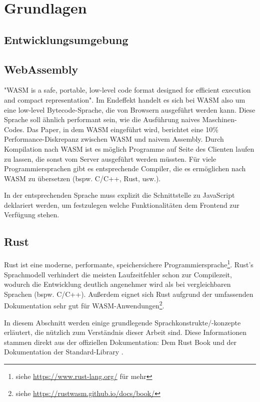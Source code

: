 \chapter{Grundlagen}\label{chap:prereqs}

\section{Entwicklungsumgebung}

\section{WebAssembly}

"\ac{WASM} is a safe, portable, low-level code format designed for efficient execution and compact representation"\cite{WebAssemblyCoreSpecification}. Im Endeffekt handelt es sich bei \ac{WASM} also um eine low-level Bytecode-Sprache, die von Browsern ausgeführt werden kann. Diese Sprache soll ähnlich performant sein, wie die Ausführung naives Maschinen-Codes. Das Paper, in dem \ac{WASM} eingeführt wird, berichtet eine 10\% Performance-Diskrepanz zwischen \ac{WASM} und naivem Assembly\cite{10.1145/3062341.3062363}. Durch Kompilation nach \ac{WASM} ist es möglich Programme auf Seite des Clienten laufen zu lassen, die sonst vom Server ausgeführt werden müssten.
Für viele Programmiersprachen gibt es entsprechende Compiler, die es ermöglichen nach \ac{WASM} zu übersetzen (bspw. C/C++, Rust, usw.).

In der entsprechenden Sprache muss explizit die Schnittstelle zu JavaScript deklariert werden, um festzulegen welche Funktionalitäten dem Frontend zur Verfügung stehen.

\section{Rust}

Rust ist eine moderne, performante, speichersichere Programmiersprache\footnote{siehe \url{https://www.rust-lang.org/} für mehr}. Rust's Sprachmodell verhindert die meisten Laufzeitfehler schon zur Compilezeit, wodurch die Entwicklung deutlich angenehmer wird als bei vergleichbaren Sprachen (bspw. C/C++). Außerdem eignet sich Rust aufgrund der umfassenden Dokumentation sehr gut für \ac{WASM}-Anwendungen\footnote{siehe \url{https://rustwasm.github.io/docs/book/}}.

In diesem Abschnitt werden einige grundlegende Sprachkonstrukte/-konzepte erläutert, die nützlich zum Verständnis dieser Arbeit sind.
Diese Informationen stammen direkt aus der offiziellen Dokumentation: Dem Rust Book \cite{rustBook} und der Dokumentation der Standard-Library \cite{rustDoc}.


